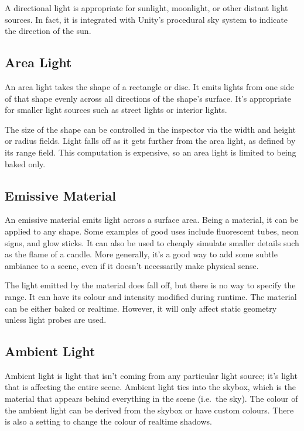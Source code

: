 \documentclass[a4paper, 12pt]{scrartcl}
\begin{document}
A directional light is appropriate for sunlight, moonlight, or other distant light sources. In fact, it is integrated with Unity's procedural sky system to indicate the direction of the sun.

\begin{figure}[!htb]
  \centering
  
  \label{fig:directional_light}
\end{figure}

\subsection{Area Light}
An area light takes the shape of a rectangle or disc. It emits lights from one side of that shape evenly across all directions of the shape's surface. It's appropriate for smaller light sources such as street lights or interior lights.

The size of the shape can be controlled in the inspector via the width and height or radius fields. Light falls off as it gets further from the area light, as defined by its range field. This computation is expensive, so an area light is limited to being baked only.

\begin{figure}[!htb]
  \centering
  
  \label{fig:area_light}
\end{figure}

\subsection{Emissive Material}
An emissive material emits light across a surface area. Being a material, it can be applied to any shape. Some examples of good uses include fluorescent tubes, neon signs, and glow sticks. It can also be used to cheaply simulate smaller details such as the flame of a candle. More generally, it's a good way to add some subtle ambiance to a scene, even if it doesn't necessarily make physical sense.

The light emitted by the material does fall off, but there is no way to specify the range. It can have its colour and intensity modified during runtime. The material can be either baked or realtime. However, it will only affect static geometry unless light probes are used.

\subsection{Ambient Light}
Ambient light is light that isn't coming from any particular light source; it's light that is affecting the entire scene. Ambient light ties into the skybox, which is the material that appears behind everything in the scene (i.e.\ the sky). The colour of the ambient light can be derived from the skybox or have custom colours. There is also a setting to change the colour of realtime shadows.
\end{document}
